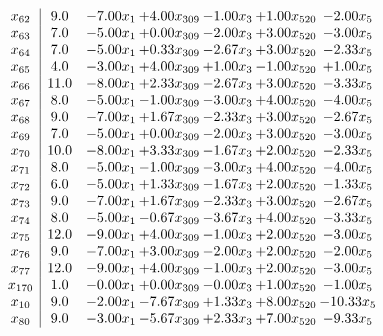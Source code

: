 \documentclass[8pt]{article}
\begin{document}
\[\begin{array}{c| c c@{\hskip 2pt} c@{\hskip 2pt} c@{\hskip 2pt} c@{\hskip 2pt} c@{\hskip 2pt} }
 x_{62}   &  9.0 & -7.00 x_{1} & +  4.00 x_{309} & -1.00 x_{3} & +  1.00 x_{520} & -2.00 x_{5}\\
 x_{63}   &  7.0 & -5.00 x_{1} & +  0.00 x_{309} & -2.00 x_{3} & +  3.00 x_{520} & -3.00 x_{5}\\
 x_{64}   &  7.0 & -5.00 x_{1} & +  0.33 x_{309} & -2.67 x_{3} & +  3.00 x_{520} & -2.33 x_{5}\\
 x_{65}   &  4.0 & -3.00 x_{1} & +  4.00 x_{309} & +  1.00 x_{3} & -1.00 x_{520} & +  1.00 x_{5}\\
 x_{66}   &  11.0 & -8.00 x_{1} & +  2.33 x_{309} & -2.67 x_{3} & +  3.00 x_{520} & -3.33 x_{5}\\
 x_{67}   &  8.0 & -5.00 x_{1} & -1.00 x_{309} & -3.00 x_{3} & +  4.00 x_{520} & -4.00 x_{5}\\
 x_{68}   &  9.0 & -7.00 x_{1} & +  1.67 x_{309} & -2.33 x_{3} & +  3.00 x_{520} & -2.67 x_{5}\\
 x_{69}   &  7.0 & -5.00 x_{1} & +  0.00 x_{309} & -2.00 x_{3} & +  3.00 x_{520} & -3.00 x_{5}\\
 x_{70}   &  10.0 & -8.00 x_{1} & +  3.33 x_{309} & -1.67 x_{3} & +  2.00 x_{520} & -2.33 x_{5}\\
 x_{71}   &  8.0 & -5.00 x_{1} & -1.00 x_{309} & -3.00 x_{3} & +  4.00 x_{520} & -4.00 x_{5}\\
 x_{72}   &  6.0 & -5.00 x_{1} & +  1.33 x_{309} & -1.67 x_{3} & +  2.00 x_{520} & -1.33 x_{5}\\
 x_{73}   &  9.0 & -7.00 x_{1} & +  1.67 x_{309} & -2.33 x_{3} & +  3.00 x_{520} & -2.67 x_{5}\\
 x_{74}   &  8.0 & -5.00 x_{1} & -0.67 x_{309} & -3.67 x_{3} & +  4.00 x_{520} & -3.33 x_{5}\\
 x_{75}   &  12.0 & -9.00 x_{1} & +  4.00 x_{309} & -1.00 x_{3} & +  2.00 x_{520} & -3.00 x_{5}\\
 x_{76}   &  9.0 & -7.00 x_{1} & +  3.00 x_{309} & -2.00 x_{3} & +  2.00 x_{520} & -2.00 x_{5}\\
 x_{77}   &  12.0 & -9.00 x_{1} & +  4.00 x_{309} & -1.00 x_{3} & +  2.00 x_{520} & -3.00 x_{5}\\
 x_{170}   &  1.0 & -0.00 x_{1} & +  0.00 x_{309} & -0.00 x_{3} & +  1.00 x_{520} & -1.00 x_{5}\\
 x_{10}   &  9.0 & -2.00 x_{1} & -7.67 x_{309} & +  1.33 x_{3} & +  8.00 x_{520} & -10.33 x_{5}\\
 x_{80}   &  9.0 & -3.00 x_{1} & -5.67 x_{309} & +  2.33 x_{3} & +  7.00 x_{520} & -9.33 x_{5}\\

\end{array}\]
\end{document}
